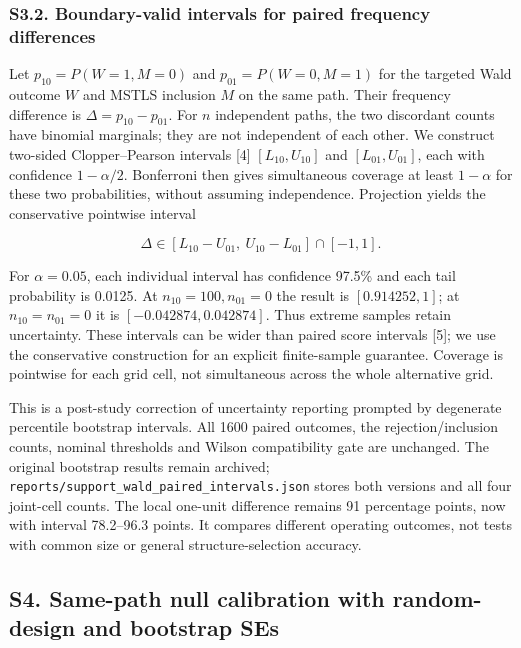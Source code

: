 \documentclass[
  american,
  11pt,
]{article}
\begin{document}
\subsubsection{S3.2. Boundary-valid intervals for paired frequency
differences}\label{s3.2.-boundary-valid-intervals-for-paired-frequency-differences}

Let \(p_{10}=P(W=1,M=0)\) and \(p_{01}=P(W=0,M=1)\) for the targeted
Wald outcome \(W\) and MSTLS inclusion \(M\) on the same path. Their
frequency difference is \(\Delta=p_{10}-p_{01}\). For \(n\) independent
paths, the two discordant counts have binomial marginals; they are not
independent of each other. We construct two-sided Clopper--Pearson
intervals {[}4{]} \([L_{10},U_{10}]\) and \([L_{01},U_{01}]\), each with
confidence \(1-\alpha/2\). Bonferroni then gives simultaneous coverage
at least \(1-\alpha\) for these two probabilities, without assuming
independence. Projection yields the conservative pointwise interval

\[
\Delta\in[L_{10}-U_{01},\ U_{10}-L_{01}]\cap[-1,1].
\]

For \(\alpha=0.05\), each individual interval has confidence 97.5\% and
each tail probability is 0.0125. At \(n_{10}=100,n_{01}=0\) the result
is \([0.914252,1]\); at \(n_{10}=n_{01}=0\) it is
\([-0.042874,0.042874]\). Thus extreme samples retain uncertainty. These
intervals can be wider than paired score intervals {[}5{]}; we use the
conservative construction for an explicit finite-sample guarantee.
Coverage is pointwise for each grid cell, not simultaneous across the
whole alternative grid.

This is a post-study correction of uncertainty reporting prompted by
degenerate percentile bootstrap intervals. All 1600 paired outcomes, the
rejection/inclusion counts, nominal thresholds and Wilson compatibility
gate are unchanged. The original bootstrap results remain archived;
\texttt{reports/support\_wald\_paired\_intervals.json} stores both
versions and all four joint-cell counts. The local one-unit difference
remains 91 percentage points, now with interval 78.2--96.3 points. It
compares different operating outcomes, not tests with common size or
general structure-selection accuracy.

\subsection{S4. Same-path null calibration with random-design and
bootstrap
SEs}\label{s4.-same-path-null-calibration-with-random-design-and-bootstrap-ses}
\end{document}
